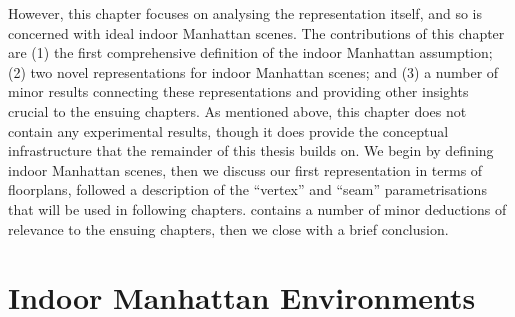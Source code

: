 However, this chapter focuses on analysing the representation itself,
and so is concerned with ideal indoor Manhattan scenes. The
contributions of this chapter are (1) the first comprehensive
definition of the indoor Manhattan assumption; (2) two novel
representations for indoor Manhattan scenes; and (3) a number of minor
results connecting these representations and providing other insights
crucial to the ensuing chapters. As mentioned above, this chapter does
not contain any experimental results, though it does provide the
conceptual infrastructure that the remainder of this thesis builds
on. We begin by defining indoor Manhattan scenes, then we discuss our
first representation in terms of floorplans, followed a description of
the ``vertex'' and ``seam'' parametrisations that will be used in
following chapters.  contains a number of minor
deductions of relevance to the ensuing chapters, then we close with a
brief conclusion.

\section{Indoor Manhattan Environments}

